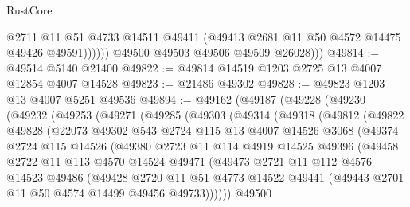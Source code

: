 \begin{lexlean}{RustCore}
\begin{coremodule}
                    @2711
                    @11
                    @51
                    @4733
                    @14511
                    @49411
                    (@49413 @2681 @11 @50 @4572 @14475 @49426 @49591))))))
          @49500
          @49503
          @49506
          @49509
          @26028)))
@49814 := @49514 @5140 @21400
@49822 := @49814 @14519 @1203 @2725 @13 @4007 @12854 @4007 @14528
@49823 := @21486 @49302
@49828 := @49823 @1203 @13 @4007 @5251 @49536
@49894 := @49162
    (@49187
      (@49228
        (@49230
          (@49232
            (@49253
              (@49271
                (@49285
                  (@49303
                    (@49314
                      (@49318
                        (@49812
                          (@49822
                            @49828
                            (@22073
                              @49302
                              @543
                              @2724
                              @115
                              @13
                              @4007
                              @14526
                              @3068
                              (@49374
                                @2724
                                @115
                                @14526
                                (@49380
                                  @2723
                                  @11
                                  @114
                                  @4919
                                  @14525
                                  @49396
                                  (@49458
                                    @2722
                                    @11
                                    @113
                                    @4570
                                    @14524
                                    @49471
                                    (@49473
                                      @2721
                                      @11
                                      @112
                                      @4576
                                      @14523
                                      @49486
                                      (@49428
                                        @2720
                                        @11
                                        @51
                                        @4773
                                        @14522
                                        @49441
                                        (@49443 @2701 @11 @50 @4574 @14499 @49456 @49733))))))
                              @49500

\end{coremodule}
\end{lexlean}
